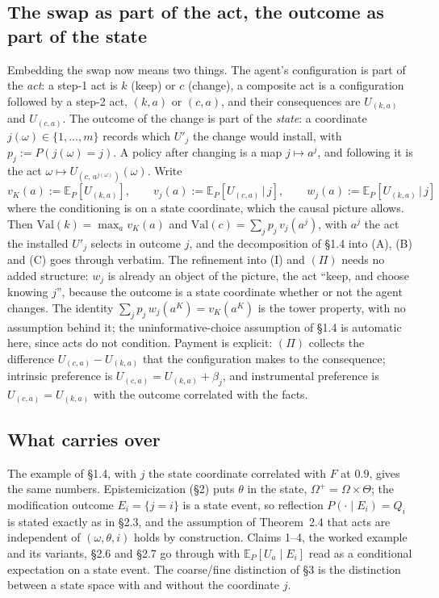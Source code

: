 \documentclass[11pt,a4paper]{article}
\begin{document}
\subsection{The swap as part of the act, the outcome as part of the state}
Embedding the swap now means two things. The agent's configuration is part of the \emph{act}: a step-1 act is $k$ (keep) or $c$ (change), a composite act is a configuration followed by a step-2 act, $(k, a)$ or $(c, a)$, and their consequences are $U_{(k,a)}$ and $U_{(c,a)}$. The outcome of the change is part of the \emph{state}: a coordinate $j(\omega) \in \{1, \ldots, m\}$ records which $U'_j$ the change would install, with $p_j := P(j(\omega) = j)$. A policy after changing is a map $j \mapsto a^j$, and following it is the act $\omega \mapsto U_{(c,\, a^{j(\omega)})}(\omega)$. Write
\[
v_K(a) := \mathbb E_P[ U_{(k,a)}], \qquad v_j(a) := \mathbb E_P[ U_{(c,a)} \,\big|\, j], \qquad w_j(a) := \mathbb E_P[ U_{(k,a)} \,\big|\, j]
\]
where the conditioning is on a state coordinate, which the causal picture allows. Then $\mathrm{Val}(k) = \max_a v_K(a)$ and $\mathrm{Val}(c) = \sum_j p_j\, v_j(a^j)$, with $a^j$ the act the installed $U'_j$ selects in outcome $j$, and the decomposition of \S1.4 into (A), (B) and (C) goes through verbatim. The refinement into (I) and $(\Pi)$ needs no added structure: $w_j$ is already an object of the picture, the act ``keep, and choose knowing $j$'', because the outcome is a state coordinate whether or not the agent changes. The identity $\sum_j p_j\, w_j(a^K) = v_K(a^K)$ is the tower property, with no assumption behind it; the uninformative-choice assumption of \S1.4 is automatic here, since acts do not condition. Payment is explicit: $(\Pi)$ collects the difference $U_{(c,a)} - U_{(k,a)}$ that the configuration makes to the consequence; intrinsic preference is $U_{(c,a)} = U_{(k,a)} + \beta_j$, and instrumental preference is $U_{(c,a)} = U_{(k,a)}$ with the outcome correlated with the facts.

\subsection{What carries over}
The example of \S1.4, with $j$ the state coordinate correlated with $F$ at $0.9$, gives the same numbers. Epistemicization (\S2) puts $\theta$ in the state, $\Omega^+ = \Omega \times \Theta$; the modification outcome $E_i = \{j = i\}$ is a state event, so reflection $P(\cdot \mid E_i) = Q_i$ is stated exactly as in \S2.3, and the assumption of Theorem~2.4 that acts are independent of $(\omega, \theta, i)$ holds by construction. Claims 1--4, the worked example and its variants, \S2.6 and \S2.7 go through with $\mathbb E_P[ U_a \mid E_i]$ read as a conditional expectation on a state event. The coarse/fine distinction of \S3 is the distinction between a state space with and without the coordinate $j$.
\end{document}
